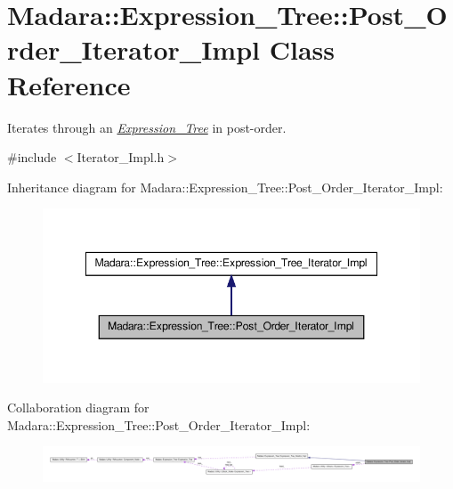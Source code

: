 \hypertarget{classMadara_1_1Expression__Tree_1_1Post__Order__Iterator__Impl}{
\section{Madara::Expression\_\-Tree::Post\_\-Order\_\-Iterator\_\-Impl Class Reference}
\label{d4/d3e/classMadara_1_1Expression__Tree_1_1Post__Order__Iterator__Impl}
}


Iterates through an {\itshape \hyperlink{classMadara_1_1Expression__Tree_1_1Expression__Tree}{Expression\_\-Tree}\/} in post-\/order.  




{\ttfamily \#include $<$Iterator\_\-Impl.h$>$}



Inheritance diagram for Madara::Expression\_\-Tree::Post\_\-Order\_\-Iterator\_\-Impl:
\nopagebreak
\begin{figure}[H]
\begin{center}
\leavevmode
\includegraphics[width=348pt]{d8/d3c/classMadara_1_1Expression__Tree_1_1Post__Order__Iterator__Impl__inherit__graph}
\end{center}
\end{figure}


Collaboration diagram for Madara::Expression\_\-Tree::Post\_\-Order\_\-Iterator\_\-Impl:
\nopagebreak
\begin{figure}[H]
\begin{center}
\leavevmode
\includegraphics[width=400pt]{d7/dbb/classMadara_1_1Expression__Tree_1_1Post__Order__Iterator__Impl__coll__graph}
\end{center}
\end{figure}
